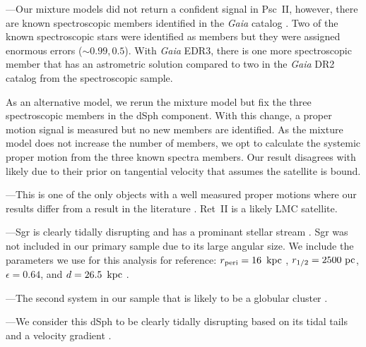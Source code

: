\documentclass[twocolumn]{aastex63}
\begin{document}
---Our mixture models did not return a confident signal in Psc~II, however, there are known spectroscopic members identified in the {\it Gaia} catalog \citep{Fritz2018A&A...619A.103F}. 
Two of the known spectroscopic stars were identified as members but they were assigned enormous errors ($\sim0.99, 0.5$).
With {\it Gaia} EDR3, there is one more spectroscopic member that has an astrometric solution compared to two in the {\it Gaia} DR2 catalog from the \citet{Kirby2015ApJ...810...56K} spectroscopic sample. 

As an alternative model, we rerun the mixture model but fix the three  spectroscopic members in the dSph component.  With this change, a proper motion signal is measured but no new members are identified. 
As the mixture model does not increase the number of members, we opt to calculate the systemic proper motion from the three known spectra members. 
Our result disagrees with \citet{McConnachie2020RNAAS...4..229M} likely due to their prior on tangential velocity that assumes the satellite is bound. 


---This is one of the only objects with a well measured proper motions where our results differ from a result in the literature \citep{MartinezGarcia2021MNRAS.505.5884M}.
Ret~II is a likely LMC satellite. 


---Sgr is clearly tidally disrupting and has a prominant stellar stream \citep{Vasiliev2021MNRAS.501.2279V}.  Sgr was not included in our primary sample due to its large angular size.  We include the parameters we use for this analysis for reference: $r_{\rm peri}=16 ~\mathrm{\,kpc}$ \citep{Vasiliev2021MNRAS.501.2279V}, $r_{1/2}=2500~{\rm pc}$, $\epsilon=0.64$, and $d=26.5~\mathrm{\,kpc}$  \citep{McConnachie2012AJ....144....4M}. 

---The second system in our sample that is likely to be a globular cluster \citep{Longeard2021MNRAS.503.2754L, Baumgardt2022MNRAS.510.3531B}.  


---We consider this dSph to be clearly tidally disrupting based on its tidal tails \citep{DrlicaWagner2015ApJ...813..109D} and a velocity gradient \citep{Li2018ApJ...866...22L}.
\end{document}
